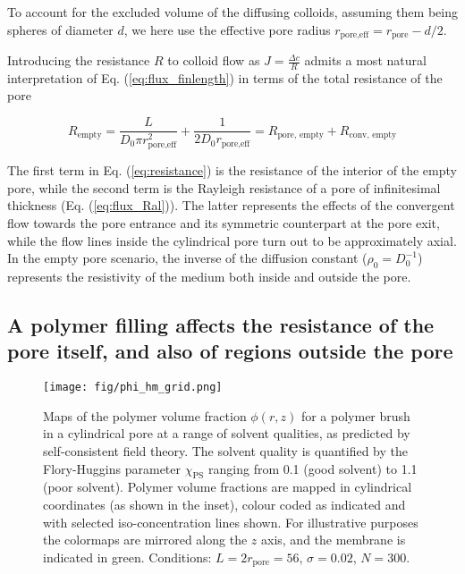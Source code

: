 \documentclass[12pt, a4paper]{article}
\begin{document}
\noindent To account for the excluded volume of the diffusing colloids, assuming them being spheres of diameter $d$, we here use the effective pore radius $r_{\text{pore,eff}}=r_{\text{pore}}-d/2$.

Introducing the resistance $R$ to colloid flow as $J=\frac{\Delta c}{R}$ admits a most natural interpretation of Eq. (\ref{eq:flux_finlength}) in terms of the total resistance of the pore

\begin{equation}
    R_{\text{empty}}=\frac{L}{D_0\pi r_{\text{pore,eff}}^{2}}+\frac{1}{2D_0r_{\text{pore,eff}}}=R_{\text{pore, empty}}+R_{\text{conv, empty}}
    \label{eq:resistance}
\end{equation}

\noindent The first term in Eq. (\ref{eq:resistance}) is the resistance of the interior of the empty pore, 
while the second term is the Rayleigh resistance of a pore of infinitesimal thickness (Eq. (\ref{eq:flux_Ral})). 
The latter represents the effects of the convergent flow towards the pore entrance and its symmetric counterpart at the pore exit, 
while the flow lines inside the cylindrical pore turn out to be approximately axial. 
In the empty pore scenario, the inverse of the diffusion constant ($\rho_0=D_0^{-1}$) represents the resistivity of the medium both inside and outside the pore. 

\subsection{A polymer filling affects the resistance of the pore itself, and also of regions outside the pore}

\begin{figure}
    \centering
    \texttt{[image: fig/phi\_hm\_grid.png]}
    \caption{
    Maps of the polymer volume fraction $\phi(r,z)$ for a polymer brush in a cylindrical pore at a range of solvent qualities, as predicted by self-consistent field theory. 
    The solvent quality is quantified by the Flory-Huggins parameter $\chi_{\text{PS}}$ ranging from 0.1 (good solvent) to 1.1 (poor solvent).
    Polymer volume fractions are mapped in cylindrical coordinates (as shown in the inset), colour coded as indicated and with selected iso-concentration lines shown. 
    For illustrative purposes the colormaps are mirrored along the $z$ axis, and the membrane is indicated in green.
    Conditions: $L=2r_{\text{pore}}=56$, $\sigma=0.02$, $N=300$.
    }
    \label{fig:phi_hm_grid}
\end{figure}
\end{document}
